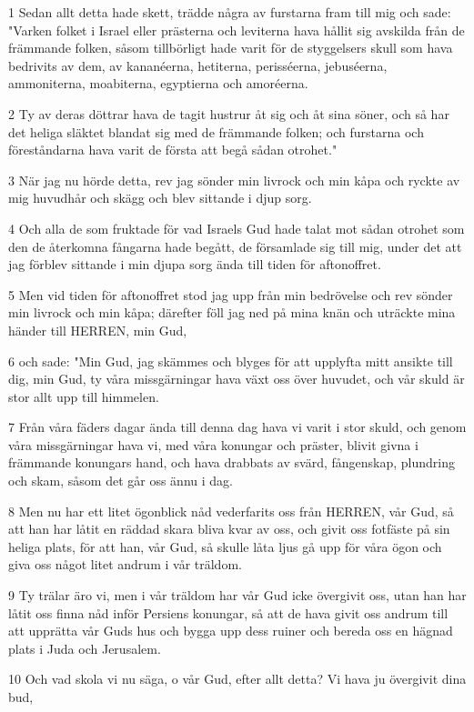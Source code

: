 \par 1 Sedan allt detta hade skett, trädde några av furstarna fram till mig och sade: "Varken folket i Israel eller prästerna och leviterna hava hållit sig avskilda från de främmande folken, såsom tillbörligt hade varit för de styggelsers skull som hava bedrivits av dem, av kananéerna, hetiterna, perisséerna, jebuséerna, ammoniterna, moabiterna, egyptierna och amoréerna.
\par 2 Ty av deras döttrar hava de tagit hustrur åt sig och åt sina söner, och så har det heliga släktet blandat sig med de främmande folken; och furstarna och föreståndarna hava varit de första att begå sådan otrohet."
\par 3 När jag nu hörde detta, rev jag sönder min livrock och min kåpa och ryckte av mig huvudhår och skägg och blev sittande i djup sorg.
\par 4 Och alla de som fruktade för vad Israels Gud hade talat mot sådan otrohet som den de återkomna fångarna hade begått, de församlade sig till mig, under det att jag förblev sittande i min djupa sorg ända till tiden för aftonoffret.
\par 5 Men vid tiden för aftonoffret stod jag upp från min bedrövelse och rev sönder min livrock och min kåpa; därefter föll jag ned på mina knän och uträckte mina händer till HERREN, min Gud,
\par 6 och sade: "Min Gud, jag skämmes och blyges för att upplyfta mitt ansikte till dig, min Gud, ty våra missgärningar hava växt oss över huvudet, och vår skuld är stor allt upp till himmelen.
\par 7 Från våra fäders dagar ända till denna dag hava vi varit i stor skuld, och genom våra missgärningar hava vi, med våra konungar och präster, blivit givna i främmande konungars hand, och hava drabbats av svärd, fångenskap, plundring och skam, såsom det går oss ännu i dag.
\par 8 Men nu har ett litet ögonblick nåd vederfarits oss från HERREN, vår Gud, så att han har låtit en räddad skara bliva kvar av oss, och givit oss fotfäste på sin heliga plats, för att han, vår Gud, så skulle låta ljus gå upp för våra ögon och giva oss något litet andrum i vår träldom.
\par 9 Ty trälar äro vi, men i vår träldom har vår Gud icke övergivit oss, utan han har låtit oss finna nåd inför Persiens konungar, så att de hava givit oss andrum till att upprätta vår Guds hus och bygga upp dess ruiner och bereda oss en hägnad plats i Juda och Jerusalem.
\par 10 Och vad skola vi nu säga, o vår Gud, efter allt detta? Vi hava ju övergivit dina bud,
